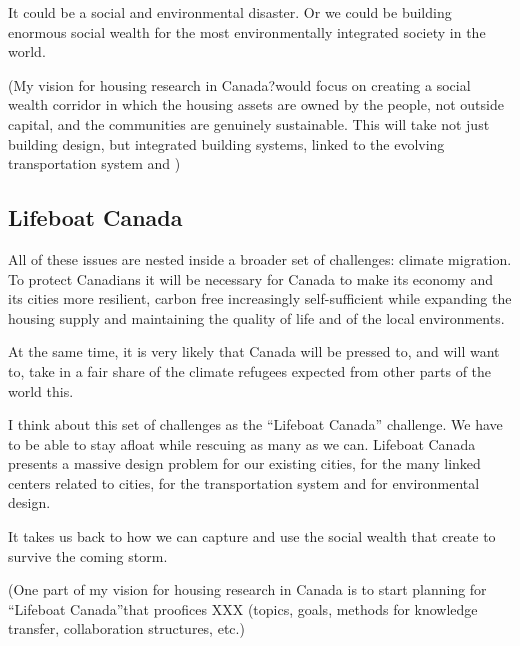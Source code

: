 It could be a social and environmental disaster. Or we could be building enormous social wealth for the most environmentally integrated society in the  world. 
    
        {\color{red}(My vision for housing research in Canada?would focus on creating a social wealth corridor in which the housing assets are owned by the people, not outside capital, and the communities are genuinely sustainable. This will take not just building design, but integrated building systems, linked to the evolving transportation system and )}

 \subsection{Lifeboat Canada}
 All of these issues are nested inside a broader set of challenges: climate migration. To protect Canadians it will be necessary for Canada to make its economy and its cities more resilient, carbon free  increasingly self-sufficient while expanding the housing supply and  maintaining the quality of life and of the local environments. 
 
 At the same time, it is very likely that Canada will be pressed to, and will want to, take in a fair share of the climate refugees expected from  other parts of the world this.

 I think about this  set of challenges as the ``Lifeboat Canada'' challenge. We have to be able to stay afloat while rescuing as many as we can. Lifeboat Canada presents a massive design problem  for our  existing cities, for the many linked centers related to cities, for the transportation system and for environmental design. 

 It takes us back to how we can capture and use the social wealth that create to survive the coming storm. 
 

  {\color{red}(One part of my vision for housing research in Canada  is to start planning for ``Lifeboat Canada''that proofices XXX (topics, goals, methods for knowledge transfer, collaboration structures, etc.)}
 

